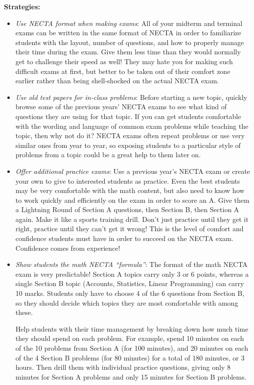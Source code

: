 \textbf{Strategies:}
\begin{itemize}
\item\emph{Use NECTA format when making exams}: All of your midterm and terminal exams can be written in the same format of NECTA in order to familiarize students with the layout, number of questions, and how to properly manage their time during the exam. Give them less time than they would normally get to challenge their speed as well! They may hate you for making such difficult exams at first, but better to be taken out of their comfort zone earlier rather than being shell-shocked on the actual NECTA exam.

\item\emph{Use old test papers for in-class problems}: Before starting a new topic, quickly browse some of the previous years' NECTA exams to see what kind of questions they are using for that topic. If you can get students comfortable with the wording and language of common exam problems while teaching the topic, then why not do it? NECTA exams often repeat problems or use very similar ones from year to year, so exposing students to a particular style of problems from a topic could be a great help to them later on.

\item\emph{Offer additional practice exams}: Use a previous year's NECTA exam or create your own to give to interested students as practice. Even the best students may be very comfortable with the math content, but also need to know how to work quickly and efficiently on the exam in order to score an A. Give them a Lightning Round of Section A questions, then Section B, then Section A again. Make it like a sports training drill. Don't just practice until they get it right, practice until they can't get it wrong! This is the level of comfort and confidence students must have in order to succeed on the NECTA exam. Confidence comes from experience!

\item\emph{Show students the math NECTA ``formula''}: The format of the math NECTA exam is very predictable! Section A topics carry only 3 or 6 points, whereas a single Section B topic (Accounts, Statistics, Linear Programming) can carry 10 marks. Students only have to choose 4 of the 6 questions from Section B, so they should decide which topics they are most comfortable with among these. 

Help students with their time management by breaking down how much time they should spend on each problem. For example, spend 10 minutes on each of the 10 problems from Section A (for 100 minutes), and 20 minutes on each of the 4 Section B problems (for 80 minutes) for a total of 180 minutes, or 3 hours. Then drill them with individual practice questions, giving only 8 minutes for Section A problems and only 15 minutes for Section B problems.
\end{itemize}

